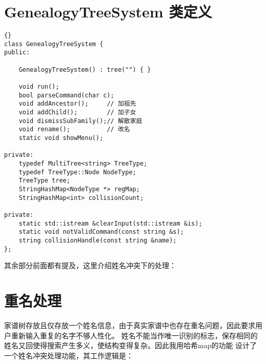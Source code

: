 \section{GenealogyTreeSystem 类定义}
\begin{lstlisting}[firstnumber=911, caption=GenealogyTreeSystem 类定义]{}
class GenealogyTreeSystem {
public:

    GenealogyTreeSystem() : tree("") { }

    void run();
    bool parseCommand(char c);
    void addAncestor();     // 加祖先
    void addChild();        // 加子女
    void dismissSubFamily();// 解散家庭
    void rename();          // 改名
    static void showMenu();

private:
    typedef MultiTree<string> TreeType;
    typedef TreeType::Node NodeType;
    TreeType tree;
    StringHashMap<NodeType *> regMap;
    StringHashMap<int> collisionCount;

private:
    static std::istream &clearInput(std::istream &is);
    static void notValidCommand(const string &s);
    string collisionHandle(const string &name);
};
\end{lstlisting}

其余部分前面都有提及，这里介绍姓名冲突下的处理：

\section{重名处理}

家谱树存放且仅存放一个姓名信息，由于真实家谱中也存在重名问题，因此要求用户重新输入重复的名字不够人性化。%
姓名不能当作唯一识别的标志，保存相同的姓名又回使得搜索产生多义，使结构变得复杂。因此我用哈希map的功能%
设计了一个姓名冲突处理功能，其工作逻辑是：


